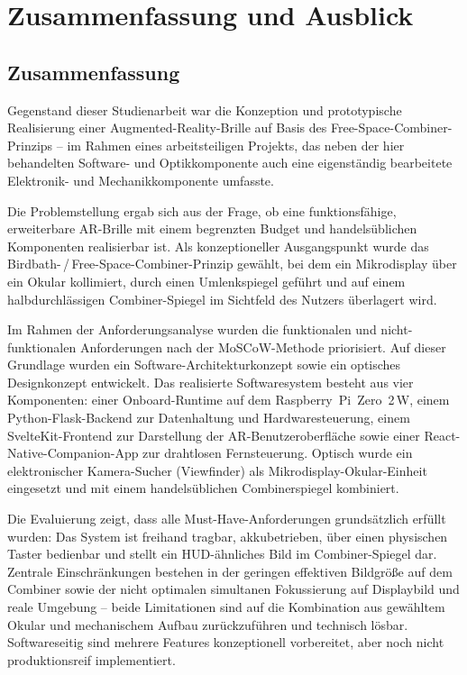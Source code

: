 

\chapter{Zusammenfassung und Ausblick}
\label{chap:ZusammenfassungUndAusblick}

\section{Zusammenfassung}
\label{sec:Zusammenfassung}

Gegenstand dieser Studienarbeit war die Konzeption und prototypische Realisierung
einer Augmented-Reality-Brille auf Basis des Free-Space-Combiner-Prinzips --
im Rahmen eines arbeitsteiligen Projekts, das neben der hier behandelten
Software- und Optikkomponente auch eine eigenständig bearbeitete Elektronik-
und Mechanikkomponente umfasste.

Die Problemstellung ergab sich aus der Frage, ob eine funktionsfähige,
erweiterbare AR-Brille mit einem begrenzten Budget und handelsüblichen
Komponenten realisierbar ist.
Als konzeptioneller Ausgangspunkt wurde das Birdbath-\,/\,Free-Space-Combiner-Prinzip
gewählt, bei dem ein Mikrodisplay über ein Okular kollimiert,
durch einen Umlenkspiegel geführt und auf einem halbdurchlässigen Combiner-Spiegel
im Sichtfeld des Nutzers überlagert wird.

Im Rahmen der Anforderungsanalyse wurden die funktionalen und nicht-funktionalen
Anforderungen nach der MoSCoW-Methode priorisiert.
Auf dieser Grundlage wurden ein Software-Architekturkonzept sowie ein optisches
Designkonzept entwickelt.
Das realisierte Softwaresystem besteht aus vier Komponenten:
einer Onboard-Runtime auf dem Raspberry~Pi~Zero~2\,W,
einem Python-Flask-Backend zur Datenhaltung und Hardwaresteuerung,
einem SvelteKit-Frontend zur Darstellung der AR-Benutzeroberfläche
sowie einer React-Native-Companion-App zur drahtlosen Fernsteuerung.
Optisch wurde ein elektronischer Kamera-Sucher (Viewfinder) als
Mikrodisplay-Okular-Einheit eingesetzt und mit einem handelsüblichen
Combinerspiegel kombiniert.

Die Evaluierung zeigt, dass alle Must-Have-Anforderungen grundsätzlich erfüllt
wurden: Das System ist freihand tragbar, akkubetrieben, über einen physischen
Taster bedienbar und stellt ein HUD-ähnliches Bild im Combiner-Spiegel dar.
\newpage
Zentrale Einschränkungen bestehen in der geringen effektiven Bildgröße auf dem
Combiner sowie der nicht optimalen simultanen Fokussierung auf Displaybild
und reale Umgebung -- beide Limitationen sind auf die Kombination aus gewähltem
Okular und mechanischem Aufbau zurückzuführen und technisch lösbar.
Softwareseitig sind mehrere Features konzeptionell vorbereitet, aber noch nicht produktionsreif implementiert.

